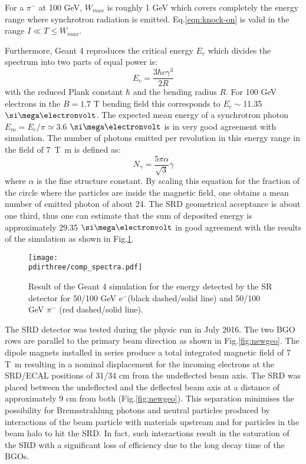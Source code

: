 For a $\pi^-$ at 100 GeV, $W_{max}$ is roughly 1 GeV which
covers completely the energy range where synchrotron radiation is
emitted. Eq.\ref{eqn:knock-on} is valid in the range $I\ll T \leq W_{max}$.
 \par 
Furthermore, Geant 4 reproduces the critical energy $E_c$ which divides the spectrum into two parts of equal power is:
\begin{equation}
E_c = \frac{3 \hbar c \gamma^3}{2R}
\end{equation}
with the reduced Plank constant $\hbar$ and the bending radius $R$. 
 For 100 GeV electrons in the  $B=1.7$ T bending field this corresponds to $E_c\sim$11.35 $\mev$. The expected mean energy of a synchrotron photon $E_m=E_c/\pi\simeq 3.6$ $\mev$ is in very good agreement with simulation. The number of photons emitted per revolution in this energy range in the field of \SI{7}{\tesla\meter} is defined as:
\begin{equation}
N_\gamma = \frac{5 \pi \alpha}{\sqrt{3}}\gamma
\end{equation}
where $\alpha$ is the fine structure constant. 
By scaling this equation for the fraction of the circle where the particles are inside the magnetic field, one obtains a mean number of emitted photon of about 24.
The SRD geometrical acceptance is about one third,  thus one can estimate that the sum of deposited energy is approximately 29.35 $\mev$ in good agreement with the results of the simulation as shown in Fig.\ref{fig:SRspectrum}. 
 
\begin{figure}[htb!]
\centering
\texttt{[image: \\pdirthree/comp\_spectra.pdf]}
\caption[SR spectrum for different energy detected in the SRD]{Result of the Geant 4 simulation for the energy detected by the SR detector for 50/100 GeV e$^-$(black dashed/solid line) and 50/100 GeV $\pi^-$ (red dashed/solid line).}
\label{fig:SRspectrum}
\end{figure}

The SRD detector was tested during the physic run in July 2016. The two BGO rows are parallel to the primary beam direction as shown in Fig.\ref{fig:newgeo}. The dipole magnets installed in series produce a total integrated magnetic field of 7 \si{\tesla\meter} \cite{Banerjee:2016tad} resulting in a nominal displacement for the incoming electrons at the SRD/ECAL positions of 31/34 cm from the undeflected beam axis. The SRD was placed between the undeflected and the deflected beam axis at a distance of approximately 9 cm from both (Fig.\ref{fig:newgeo}). This separation minimises the possibility for Bremsstrahlung photons and neutral particles produced by interactions of the beam particle with materials upstream and for particles in the beam halo to hit the SRD. In fact, such interactions result in the saturation of the SRD with a significant loss of efficiency due to the long decay time of the BGOs.

